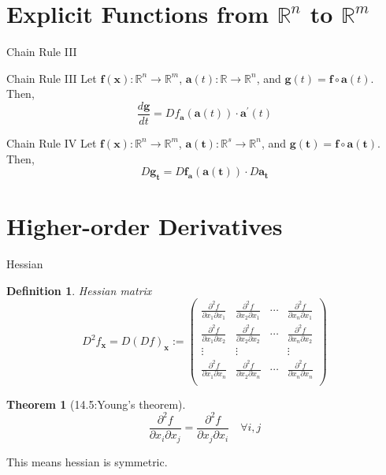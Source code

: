 \documentclass[a4paper,11pt]{article}
\newtheorem{defn}{Definition}
\newtheorem{thm}{Theorem}
\newcommand{\bb}{\mathbb}
\newcommand{\bd}{\mathbf}
\newcommand{\p}{\partial}
\begin{document}
\section{Explicit Functions from $\mathbb{R}^n$ to $\mathbb{R}^m$} %
\label{sec:explicit_functions_from_mathbb_r_n_to_mathbb_r_m}
\begin{frame}[t]{Chain Rule III}
	\begin{block}
		{Chain Rule III}
		Let $\bd f(\bd x): \bb{R}^n\rightarrow \bb{R}^m$, $\bd a(t):\bb{R}\rightarrow\bb{R}^n$, and $\bd g(t) = \bd f \circ \bd a (t)$. Then, \[
			\frac{d\bd g}{dt} = Df_{\bd a}(\bd a(t))\cdot \bd a^\prime (t)
		\]
	\end{block}
	\begin{block}
		{Chain Rule IV}
		Let $\bd f(\bd x): \bb{R}^n\rightarrow \bb{R}^m$, $\bd a(\bd t ):\bb{R}^s\rightarrow\bb{R}^n$, and $\bd g(\bd t) = \bd f \circ \bd a (\bd t)$. Then, \[
			{D\bd g}_{\bd t} = {D\bd f}_{\bd a} (\bd a(\bd t))\cdot D\bd a_{\bd t}
		\]
	\end{block}
\end{frame}
\section{Higher-order Derivatives} %
\label{sec:higher_order_derivatives}
\begin{frame}[t]{Hessian}
	\begin{defn}
		{Hessian matrix}\[
			D^2 f_{\bd x} = D(Df)_{\bd x}:=\begin{pmatrix}
				\frac{\p^2 f}{\p x_1 \p x_1} & \frac{\p^2 f}{\p x_2\p x_1} & \cdots & \frac{\p^2 f}{\p x_n \p x_1}\\
				\frac{\p^2 f}{\p x_1 \p x_2} & \frac{\p^2 f}{\p x_2\p x_2} & \cdots & \frac{\p^2 f}{\p x_n \p x_2}\\
				\vdots & \vdots & &\vdots\\
				\frac{\p^2 f}{\p x_1 \p x_n} & \frac{\p^2 f}{\p x_2\p x_n} & \cdots & \frac{\p^2 f}{\p x_n \p x_n}\\
			\end{pmatrix}
		\]
	\end{defn}
	\begin{thm}
		[14.5:Young's theorem]
		\[
			 \frac{\p^2 f}{\p x_i\p x_j} =  \frac{\p^2 f}{\p x_j\p x_i} \quad\forall i,j
		\]
	\end{thm}
	This means hessian is symmetric.
\end{frame}
\end{document}
